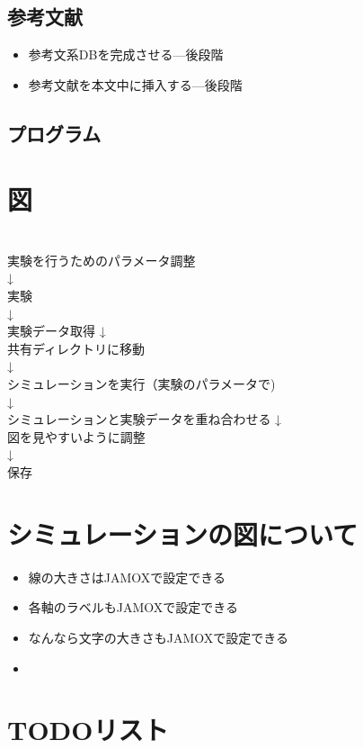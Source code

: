 	\subsection{参考文献}
		\begin{itemize}
		  \item 参考文系DBを完成させる---後段階
		  \item 参考文献を本文中に挿入する---後段階
		\end{itemize}
	\subsection{プログラム}
\section{図}
 \ \\
 実験を行うためのパラメータ調整\\
 ↓\\
 実験\\
 ↓\\
 実験データ取得
 ↓\\ 
 共有ディレクトリに移動\\
 ↓\\
 シミュレーションを実行（実験のパラメータで)\\
 ↓\\
 シミュレーションと実験データを重ね合わせる
 ↓\\
 図を見やすいように調整\\
 ↓\\
 保存\\
 
 \section{シミュレーションの図について}
 \begin{itemize}
   \item 線の大きさはJAMOXで設定できる
   \item 各軸のラベルもJAMOXで設定できる
   \item なんなら文字の大きさもJAMOXで設定できる
   \item 
 \end{itemize}
 
 \section{TODOリスト}
